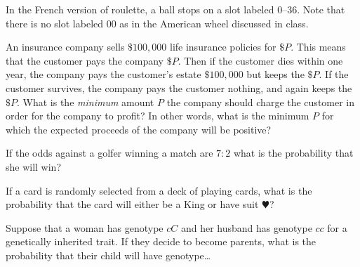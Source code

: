 \documentclass[addpoints,12pt]{exam}
\begin{document}
\begin{questions}

\question[12] In the French version of roulette, a ball stops
on a slot labeled $0$--$36$. Note that there is no slot labeled
$00$ as in the American wheel discussed in class.

\question[12] An insurance company sells $\$100,000$
life insurance policies for $\$P$. This means that the customer
pays the company $\$P$. Then
if the customer dies within one year, the company
pays the customer's estate $\$100,000$ but keeps the $\$P$.
If the customer survives, the company pays the customer nothing, and again
keeps the $\$P$. What is the {\em minimum} amount $P$ the
company should charge the customer in order
for the company to profit? In other words, what is the minimum
$P$ for which the expected proceeds of the company will be positive?

\question[10] If the odds against a golfer winning a match
are $7:2$ what is the probability that she will win?

\question[10] If a card is randomly selected from a deck
of playing cards, what is the probability that the card
will either be a King or have suit $\varheart$?

\question[12]
Suppose that a woman has genotype $cC$
and her husband has genotype $cc$ for a
genetically inherited trait.
If they decide to become parents,
what is the probability that their child will
have genotype\dots
{}
\end{questions}
\end{document}
